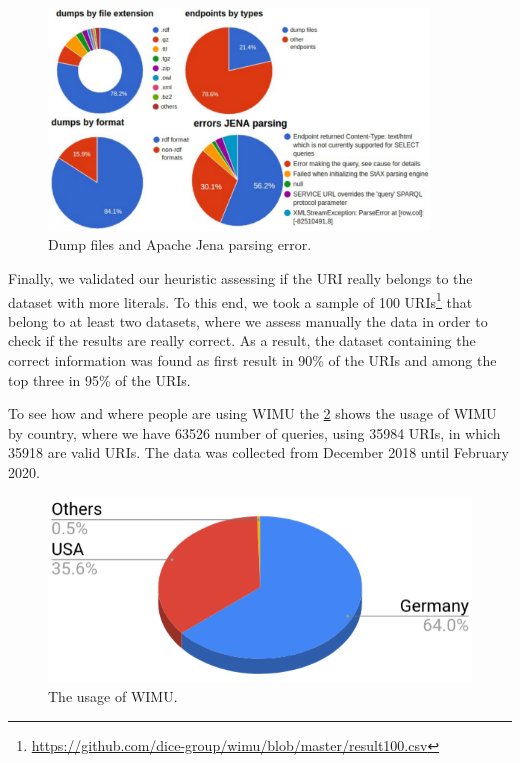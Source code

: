 \documentclass[sw]{iosart2x}
\begin{document}
\begin{figure}[htp] 
	\centering
	\includegraphics[width=0.9\textwidth]{img/dumps3.pdf}
	\caption{Dump files and Apache Jena parsing error.}
	\label{fig:dumps}
\end{figure}

Finally, we validated our heuristic assessing if the URI really belongs to the dataset with more literals.
To this end, we took a sample of 100 URIs\footnote{\url{https://github.com/dice-group/wimu/blob/master/result100.csv}} that belong to at least two datasets, where we assess manually the data in order to check if the results are really correct. 
As a result, the dataset containing the correct information was found as first result in 90\% of the URIs and among the top three in 95\% of the URIs.

To see how and where people are using WIMU the \cref{fig:wimuUsage} shows the usage of WIMU by country, where we have 63526 number of queries, using 35984 URIs, in which 35918 are valid URIs. The data was collected from December 2018 until February 2020. 

\begin{figure}[htp] 
	\centering
	\includegraphics[width=\linewidth]{img/wimuUsage.png}
	\caption{The usage of WIMU.}
	\label{fig:wimuUsage}
\end{figure}
\end{document}
